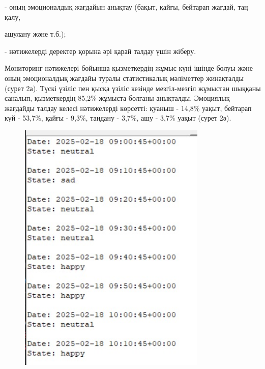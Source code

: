 \begin{multicols}{2}
- оның эмоционалдық жағдайын анықтау (бақыт, қайғы, бейтарап жағдай, таң
қалу,

ашулану және т.б.);

- нәтижелерді деректер қорына әрі қарай талдау үшін жіберу.

Мониторинг нәтижелері бойынша қызметкердің жұмыс күні ішінде болуы және
оның эмоционалдық жағдайы туралы статистикалық мәліметтер жинақталды
(сурет 2а). Түскі үзіліс пен қысқа үзіліс кезінде мезгіл-мезгіл жұмыстан
шыққаны саналып, қызметкердің 85,2\% жұмыста болғаны анықталды.
Эмоциялық жағдайды талдау келесі нәтижелерді көрсетті: қуаныш - 14,8\%
уақыт, бейтарап күй - 53,7\%, қайғы - 9,3\%, таңдану - 3,7\%, ашу -
3,7\% уақыт (сурет 2ә).
\end{multicols}

\begin{figure}[H]
	\centering
	\includegraphics[width=0.8\textwidth]{media/ict2/image158}
	\caption*{}
\end{figure}

